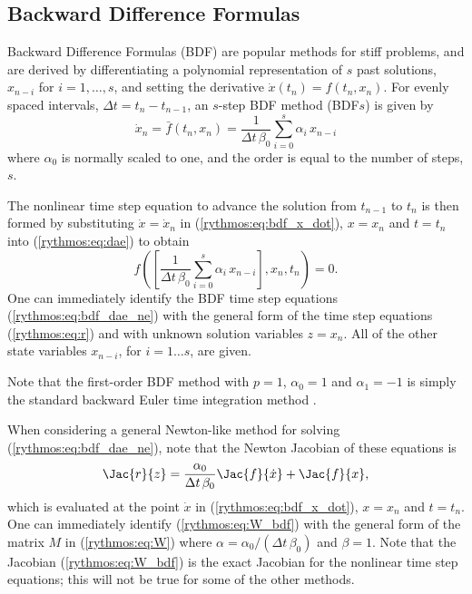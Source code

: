 
\subsection{Backward Difference Formulas}

Backward Difference Formulas (BDF) are popular methods for stiff problems,
and are derived by differentiating a polynomial representation of
$s$ past solutions, $x_{n-i}$ for $i=1,\ldots,s$, and setting the
derivative $\dot{x}(t_{n})=f(t_{n},x_{n})$. For evenly spaced intervals,
$\Delta t=t_{n}-t_{n-1}$, an $s$-step BDF method (BDF$s$) is given
by
\begin{equation}
\dot{x}_{n}=\bar{f}(t_{n},x_{n})=\frac{1}{\Delta t\,\beta_{0}}\sum_{i=0}^{s}\alpha_{i}\, x_{n-i}\label{rythmos:eq:bdf_x_dot}
\end{equation}
where $\alpha_{0}$ is normally scaled to one, and the order is equal
to the number of steps, $s$.

The nonlinear time step equation to advance the solution from $t_{n-1}$
to $t_{n}$ is then formed by substituting $\dot{x}=\dot{x}_{n}$
in (\ref{rythmos:eq:bdf_x_dot}), $x=x_{n}$ and $t=t_{n}$ into (\ref{rythmos:eq:dae})
to obtain 
\begin{equation}
f\left(\left[\frac{1}{\Delta t\,\beta_{0}}\sum_{i=0}^{s}\alpha_{i}\, x_{n-i}\right],x_{n},t_{n}\right)=0.\label{rythmos:eq:bdf_dae_ne}
\end{equation}
One can immediately identify the BDF time step equations (\ref{rythmos:eq:bdf_dae_ne})
with the general form of the time step equations (\ref{rythmos:eq:r})
and with unknown solution variables $z=x_{n}$. All of the other state
variables $x_{n-i}$, for $i=1\ldots s$, are given.

Note that the first-order BDF method with $p=1$, $\alpha_{0}=1$
and $\alpha_{1}=-1$ is simply the standard backward Euler time integration
method \cite{AscherPetzold}.

When considering a general Newton-like method for solving (\ref{rythmos:eq:bdf_dae_ne}),
note that the Newton Jacobian of these equations is 
\begin{equation}
\Jac{r}{z}=\frac{\alpha_{0}}{\Delta t\,\beta_{0}}\Jac{f}{\dot{x}}+\Jac{f}{x},\label{rythmos:eq:W_bdf}
\end{equation}
which is evaluated at the point $\dot{x}$ in (\ref{rythmos:eq:bdf_x_dot}),
$x=x_{n}$ and $t=t_{n}$. One can immediately identify (\ref{rythmos:eq:W_bdf})
with the general form of the matrix $M$ in (\ref{rythmos:eq:W})
where $\alpha=\alpha_{0}/(\Delta t\,\beta_{0})$ and $\beta=1$. Note
that the Jacobian (\ref{rythmos:eq:W_bdf}) is the exact Jacobian
for the nonlinear time step equations; this will not be true for some
of the other methods.

